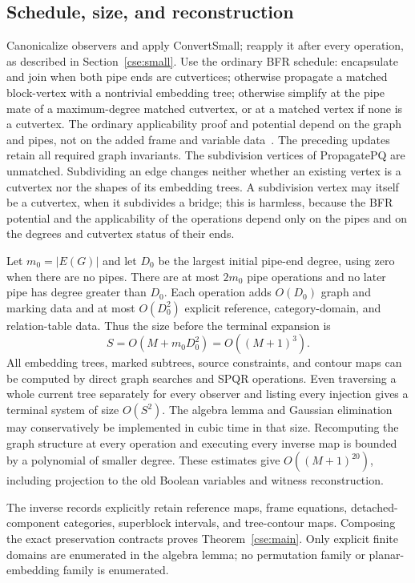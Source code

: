 \subsection{Schedule, size, and reconstruction}
\label{cse:schedule}

Canonicalize observers and apply ConvertSmall; reapply it after every
operation, as described in Section~\ref{cse:small}. Use the ordinary BFR schedule: encapsulate and join when
both pipe ends are cutvertices; otherwise propagate a matched block-vertex
with a nontrivial embedding tree; otherwise simplify at the pipe mate of a
maximum-degree matched cutvertex, or at a matched vertex if none is a
cutvertex. The ordinary
applicability proof and potential depend on the graph and pipes, not on
the added frame and variable data~\cite{bfr}. The preceding updates retain
all required graph invariants. The subdivision vertices of PropagatePQ
are unmatched. Subdividing an edge changes neither whether an existing
vertex is a cutvertex nor the shapes of its embedding trees. A
subdivision vertex may itself be a cutvertex, when it subdivides a bridge;
this is harmless, because the BFR potential and the applicability of the
operations depend only on the pipes and on the degrees and cutvertex
status of their ends.

Let $m_0=|E(G)|$ and let $D_0$ be the largest initial pipe-end degree,
using zero when there are no pipes. There are at most $2m_0$ pipe
operations and no later pipe has degree greater than $D_0$. Each operation
adds $O(D_0)$ graph and marking data and at most $O(D_0^2)$ explicit
reference, category-domain, and relation-table data. Thus the size before
the terminal expansion is
\[
 S=O(M+m_0D_0^2)=O((M+1)^3).
\]
All embedding trees, marked subtrees, source constraints, and contour maps
can be computed by direct graph searches and SPQR operations. Even
traversing a whole current tree separately for every observer and listing
every injection gives a terminal system of size $O(S^2)$. The algebra
lemma and Gaussian elimination may conservatively be implemented in
cubic time in that size. Recomputing the graph structure at every
operation and executing every inverse map is bounded by a polynomial
of smaller degree. These estimates give $O((M+1)^{20})$, including
projection to the old Boolean variables and witness reconstruction.

The inverse records explicitly retain reference maps, frame equations,
detached-component categories, superblock intervals, and tree-contour
maps. Composing the exact preservation contracts proves
Theorem~\ref{cse:main}. Only explicit finite domains are enumerated in the
algebra lemma; no permutation family or planar-embedding family is
enumerated.

